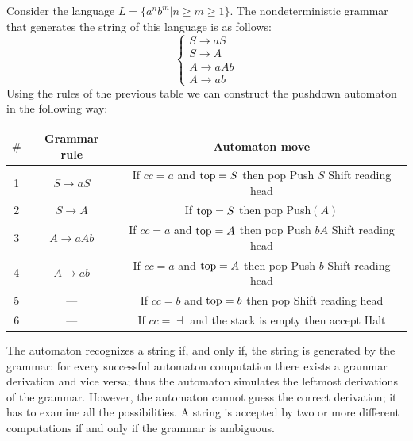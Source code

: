 \begin{example}
    Consider the language $L=\{a^nb^m|n \geq m \geq 1\}$. 
    The nondeterministic grammar that generates the string of this language is as follows: 
    \[
    \begin{cases}
        S \rightarrow aS \\
        S \rightarrow A \\
        A \rightarrow aAb \\
        A \rightarrow ab
    \end{cases}
    \]
    Using the rules of the previous table we can construct the pushdown automaton in the following way: 
    \begin{table}[H]
        \centering
        \begin{tabular}{|ccc|}
        \hline
        $\#$ & \textbf{Grammar rule}    & \textbf{Automaton move}                                                                                   \\ \hline
        1    & $ S \rightarrow aS$      & \makecell{If $cc=a$ and $\textnormal{top}=S$ then pop \\ Push $S$ \\ Shift reading head}                  \\ 
        2    & $S \rightarrow A$        & \makecell{If $\textnormal{top}=S$ then pop \\ Push$(A)$   }                                               \\ 
        3    & $A \rightarrow aAb$      & \makecell{If $cc=a$ and $\textnormal{top}=A$ then pop \\ Push $bA$ \\ Shift reading head}                 \\ 
        4    & $A \rightarrow ab$       & \makecell{If $cc=a$ and $\textnormal{top}=A$ then pop \\ Push $b$ \\ Shift reading head}                  \\ 
        5    & ---                      & \makecell{If $cc=b$ and $\textnormal{top}=b$ then pop \\ Shift reading head}                              \\ 
        6    & ---                      & \makecell{If $cc=\dashv$ and the stack is empty then accept \\ Halt}                                      \\ \hline
        \end{tabular}
    \end{table}
\end{example}
The automaton recognizes a string if, and only if, the string is generated by the grammar: for every successful automaton computation there exists a grammar derivation and vice versa; thus the automaton simulates the leftmost derivations of the grammar.
However, the automaton cannot guess the correct derivation; it has to examine all the possibilities. 
A string is accepted by two or more different computations if and only if the grammar is ambiguous.

